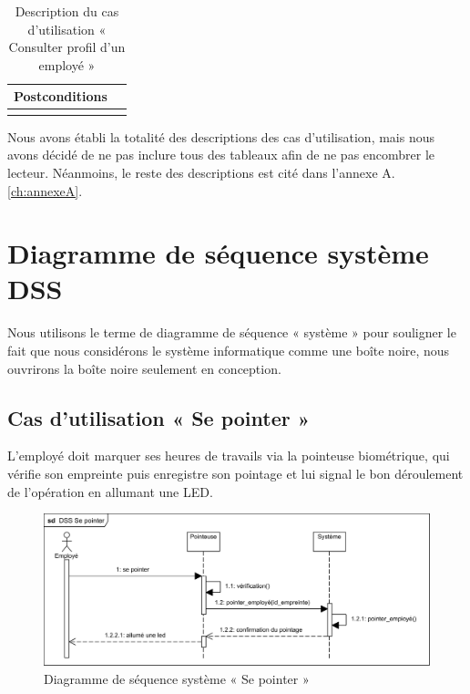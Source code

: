 \begin{longtable}{|p{4cm}|p{12cm}|}
                    \\
                    
                    \hline
                    Postconditions &   \\
                    \hline
                \hline
                \caption{Description du cas d'utilisation « Consulter profil d'un employé »}\\
        \end{longtable}        
        
            
Nous avons établi la totalité des descriptions des cas d’utilisation, mais nous
avons décidé de ne pas inclure tous des tableaux afin de ne pas encombrer le
lecteur. Néanmoins, le reste des descriptions est cité dans l’annexe A.
\ref{ch:annexeA}.  
    
                
\section{Diagramme de séquence système DSS}
Nous utilisons le terme de diagramme de séquence « système » pour souligner le
fait que nous considérons le système informatique comme une boîte noire, nous
ouvrirons la boîte noire seulement en conception.\cite{5}
    
\subsection{Cas d'utilisation « Se pointer »}
L’employé doit marquer ses heures de travails via la pointeuse biométrique, qui
vérifie son empreinte puis enregistre son pointage et lui signal le bon
déroulement de l’opération en allumant une LED.

    \begin{figure}[h!]
         \centering
        \includegraphics[scale=0.9]{images/DSS/DSS Se pointer.png}
         \caption{Diagramme de séquence système « Se pointer »}
         \label{fig4}
    \end{figure}
\vspace{-30pt}
\clearpage
